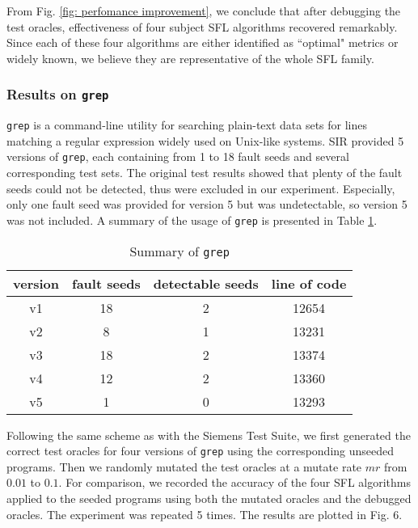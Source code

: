 From Fig. \ref{fig: perfomance improvement}, we conclude that after debugging the test oracles, effectiveness of four subject SFL algorithms recovered remarkably. Since each of these four algorithms are either identified as ``optimal" metrics or widely known, we believe they are representative of the whole SFL family.


\subsubsection{Results on \texttt{grep}}

\texttt{grep} is a command-line utility for searching plain-text data sets for lines matching a regular expression widely used on Unix-like systems. SIR\cite{doESE05} provided 5 versions of \texttt{grep}, each containing from 1 to 18 fault seeds and several corresponding test sets. The original test results showed that plenty of the fault seeds could not be detected, thus were excluded in our experiment. Especially, only one fault seed was provided for version 5 but was undetectable, so version 5 was not included. A summary of the usage of \texttt{grep} is presented in Table \ref{Tab: grep-info}.

\begin{table}
	\caption{Summary of \texttt{grep}} \label{Tab: grep-info}
	\begin{tabular}{c|c|c|c}
		\hline version & fault seeds & detectable seeds & line of code \\ 
		\hline v1 & 18 & 2 & 12654 \\ 
		\hline v2 & 8 & 1 & 13231 \\ 
		\hline v3 & 18 & 2 & 13374 \\ 
		\hline v4 & 12 & 2 & 13360 \\ 
		\hline v5 & 1 & 0 & 13293 \\ 
		\hline
	\end{tabular} 
\end{table}

Following the same scheme as with the Siemens Test Suite, we first generated the correct test oracles for four versions of \texttt{grep} using the corresponding unseeded programs. Then we randomly mutated the test oracles at a mutate rate $mr$ from $0.01$ to $0.1$. For comparison, we recorded the accuracy of the four SFL algorithms applied to the seeded programs using both the mutated oracles and the debugged oracles. The experiment was repeated 5 times. The results are plotted in Fig. 6.%


